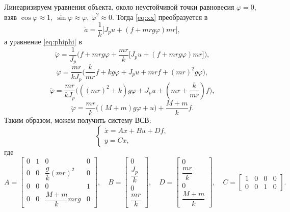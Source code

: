 Линеаризируем уравнения объекта, около неустойчивой точки равновесия $\varphi=0$, взяв 
$\cos\varphi\approx1,\ \sin\varphi\approx\varphi,\ \dot\varphi^2\approx0$.
Тогда \eqref{eq:xx} преобразуется в
\begin{equation}
    \label{lx}
    \ddot a=\frac{1}{k}
    \Big[J_pu+(f+mrg\varphi)mr\Big],
\end{equation}
а уравнение \eqref{eq:phiphi} в 
\begin{equation*}
    \ddot\varphi=\frac{1}{J_p}\Bigg(f+mrg\varphi+\frac{mr}{k}
    \Big[J_pu+(f+mrg\varphi)mr\Big] \Bigg),
\end{equation*}
\begin{equation*}
    \ddot\varphi=\frac{mr}{kJ_p}\Big(\frac{k}{mr}f+kg\varphi+
    J_pu+mrf+(mr)^2g\varphi\Big),
\end{equation*}
\begin{equation*}
    \ddot\varphi=\frac{mr}{kJ_p}\Big(
        ((mr)^2+k)g\varphi+J_pu+(mr+\frac{k}{mr})f
    \Big),
\end{equation*}
\begin{equation}
    \label{eq:lphi}
    \ddot\varphi=\frac{mr}{k}\Big(
        (M+m)g\varphi+u\Big)+\frac{M+m}{k}f
    .
\end{equation}
Таким образом, можем получить систему ВСВ:
\begin{equation}
    \label{eq:sys}
    \begin{cases}
        \dot x=Ax+Bu+Df,\\
        y=Cx,
    \end{cases}
\end{equation}
где
\begin{equation*}
    A=\begin{bmatrix}
        0&1&0&0\\
        0&0&\dfrac{g}{k}(mr)^2&0\\
        0&0&0&1\\
        0&0&\dfrac{M+m}{k}mrg&0
    \end{bmatrix},\quad
    B=\begin{bmatrix}
        0\\\dfrac{J_p}{k}\\0\\\dfrac{mr}{k}
    \end{bmatrix},\quad
    D=\begin{bmatrix}
        0\\\dfrac{mr}{k}\\0\\\dfrac{M+m}{k}
    \end{bmatrix},\quad
    C=\begin{bmatrix}
        1&0&0&0\\
        0&0&1&0
    \end{bmatrix}.
\end{equation*}


